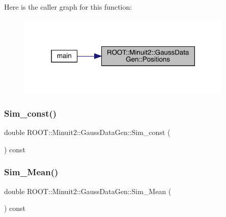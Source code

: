 Here is the caller graph for this function\+:\nopagebreak
\begin{figure}[H]
\begin{center}
\leavevmode
\includegraphics[width=291pt]{d8/d75/classROOT_1_1Minuit2_1_1GaussDataGen_a1f8db2c19b438ac1665045a5737c1d62_icgraph}
\end{center}
\end{figure}
\mbox{\label{classROOT_1_1Minuit2_1_1GaussDataGen_afa45bb0270f15866b588da8d8f56cfba}} 
\subsubsection{\texorpdfstring{Sim\_const()}{Sim\_const()}}
{\footnotesize\ttfamily double R\+O\+O\+T\+::\+Minuit2\+::\+Gauss\+Data\+Gen\+::\+Sim\+\_\+const (\begin{DoxyParamCaption}{ }\end{DoxyParamCaption}) const\hspace{0.3cm}{\ttfamily [inline]}}

\mbox{\label{classROOT_1_1Minuit2_1_1GaussDataGen_a97c0d9f3e7d706d93a06f8bad82e137a}} 
\subsubsection{\texorpdfstring{Sim\_Mean()}{Sim\_Mean()}}
{\footnotesize\ttfamily double R\+O\+O\+T\+::\+Minuit2\+::\+Gauss\+Data\+Gen\+::\+Sim\+\_\+\+Mean (\begin{DoxyParamCaption}{ }\end{DoxyParamCaption}) const\hspace{0.3cm}{\ttfamily [inline]}}

